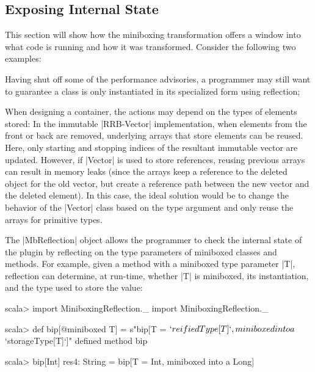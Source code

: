 \subsection{Exposing Internal State}


This section will show how the miniboxing transformation offers a window into what code is running and how it was transformed. Consider the following two examples:

\begin{compactitem}
\item Having shut off some of the performance advisories, a programmer may still want to guarantee a class is only instantiated in its specialized form using reflection;
\item When designing a container, the actions may depend on the types of elements stored: In the immutable |RRB-Vector| \cite{nicolas-thesis} implementation, when elements from the front or back are removed, underlying arrays that store elements can be reused. Here, only starting and stopping indices of the resultant immutable vector are updated. However, if |Vector| is used to store references, reusing previous arrays can result in memory leaks (since the arrays keep a reference to the deleted object for the old vector, but create a reference path between the new vector and the deleted element). In this case, the ideal solution would be to change the behavior of the |Vector| class based on the type argument and only reuse the arrays for primitive types.
\end{compactitem}

The |MbReflection| object allows the programmer to check the internal state of the plugin by reflecting on the type parameters of miniboxed classes and methods. For example, given a method with a miniboxed type parameter |T|, reflection can determine, at run-time, whether |T| is miniboxed, its instantiation, and the type used to store the value:

\begin{lstlisting-nobreak}
 scala> import MiniboxingReflection._
 import MiniboxingReflection._

 scala> def bip[@miniboxed T] = s"bip[T = ${`reifiedType[T]`}, miniboxed into a ${`storageType[T]`}]"
 defined method bip

 scala> bip[Int]
 res4: String = bip[T = Int, miniboxed into a Long]
\end{lstlisting-nobreak}

